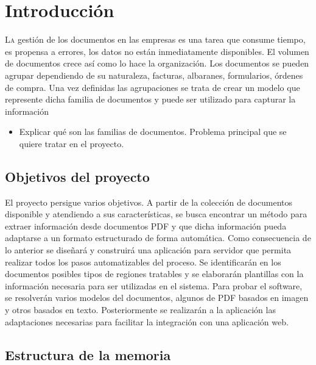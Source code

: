 
\chapter{Introducción}
\label{chap:introduccion}

\lettrine{L}a gestión de los documentos en las empresas es una tarea que consume tiempo, es propensa a errores, los datos no están inmediatamente disponibles. El volumen de documentos crece así como lo hace la organización. Los documentos se pueden agrupar dependiendo de su naturaleza, facturas, albaranes, formularios, órdenes de compra. Una vez definidas las agrupaciones se trata de crear un modelo que represente dicha familia de documentos y puede ser utilizado para capturar la información

\begin{itemize}
    \item Explicar qué son las familias de documentos. Problema principal que se quiere tratar en el proyecto.
\end{itemize}

\section{Objetivos del proyecto}

El proyecto persigue varios objetivos. A partir de la colección de documentos disponible y atendiendo a sus características, se busca encontrar un método para extraer información desde documentos PDF y que dicha información pueda adaptarse a un formato estructurado de forma automática. Como consecuencia de lo anterior se diseñará y construirá una aplicación para servidor que permita realizar todos los pasos automatizables del proceso. Se identificarán en los documentos posibles tipos de regiones tratables y se elaborarán plantillas con la información necesaria para ser utilizadas en el sistema. Para probar el software, se resolverán varios modelos del documentos, algunos de PDF basados en imagen y otros basados en texto. Posteriormente se realizarán a la aplicación las adaptaciones necesarias para facilitar la integración con una aplicación web.

\section{Estructura de la memoria}
